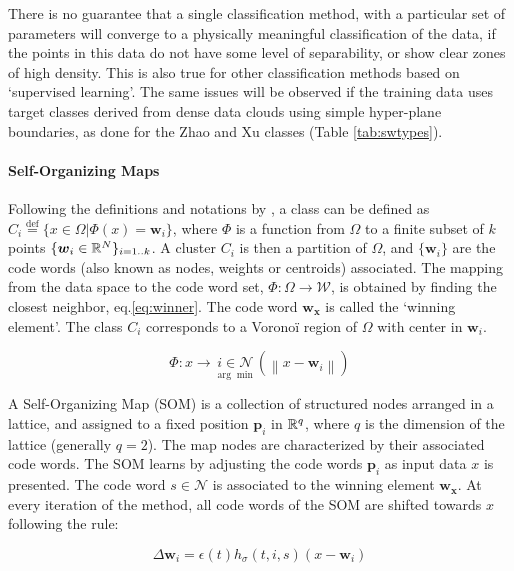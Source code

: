 There is no guarantee that a single classification method, with a particular set of parameters will converge to a physically meaningful classification of the data, if the points in this data do not have some level of separability, or show clear zones of high density. This is also true for other classification methods based on `supervised learning'. The same issues will be observed if the training data uses target classes derived from dense data clouds using simple hyper-plane boundaries, as done for the Zhao and Xu classes (Table \ref{tab:swtypes}).

\paragraph{Self-Organizing Maps}
Following the definitions and notations by \citep{[REF 23 in ROUGIER??]}, a class can be defined as $C_i\overset{\text{def}}{=} \{x\in\Omega | \Phi(x)=\boldsymbol{w}_i\}$, where $\Phi$ is a function from $\Omega$ to a finite subset of $k$ points $\{\boldsymbol{w}_i\in\Bbb R^N\}_{i=1..k}$. A cluster $C_i$ is then a partition of $\Omega$, and $\{\boldsymbol{w}_i\}$ are the code words (also known as nodes, weights or centroids) associated. The mapping from the data space to the code word set, $\Phi: \Omega\rightarrow\mathcal{W}$, is obtained by finding the closest neighbor, eq.\eqref{eq:winner}. The code word $\boldsymbol{w_x}$ is called the `winning element'. The class $C_i$ corresponds to a Vorono\"i region of $\Omega$ with center in $\boldsymbol{w}_i$.

\begin{equation}
\Phi: x \rightarrow  \underset{\arg\min}{i\in\mathcal{N}}\left( \left\lVert x - \boldsymbol{w}_i \right\rVert \right) \label{eq:winner}
\end{equation}

A Self-Organizing Map (SOM) is a collection of structured nodes arranged in a lattice, and assigned to a fixed position $\boldsymbol{p}_i$ in $\Bbb R^q$, where $q$ is the dimension of the lattice (generally $q=2$). The map nodes are characterized by their associated code words. The SOM learns by adjusting the code words $\boldsymbol{p}_i$ as input data $x$ is presented. The code word $s \in \mathcal{N}$ is associated to the winning element $\boldsymbol{w_x}$. At every iteration of the method, all code words of the SOM are shifted towards $x$ following the rule:

\begin{equation}
\Delta \boldsymbol{w}_i = \epsilon(t)h_\sigma(t,i,s)(x-\boldsymbol{w}_i)
\end{equation}

